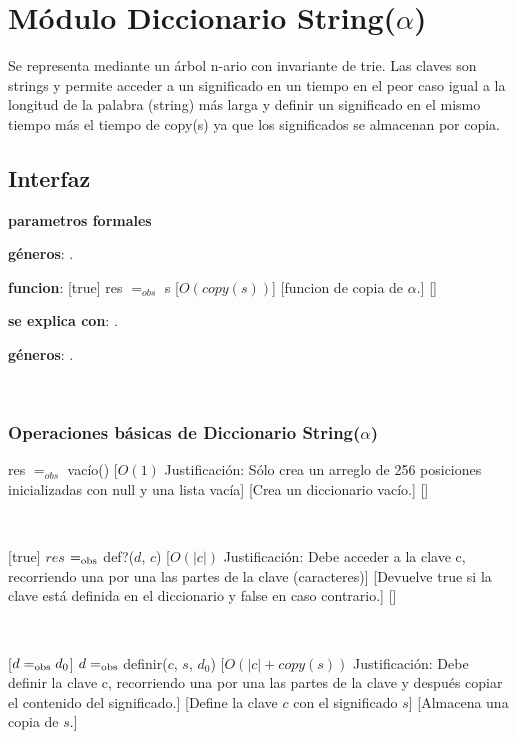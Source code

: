 \section{Módulo Diccionario String($\alpha$)}

Se representa mediante un árbol n-ario con invariante de trie. Las claves son strings y permite acceder a un significado en un tiempo en el peor caso igual a la longitud de la palabra (string) más larga y definir un significado en el mismo tiempo más el tiempo
de copy(s) ya que los significados se almacenan por copia.

\subsection{Interfaz}

\textbf{parametros formales}

\textbf{géneros}: \TipoVariable{$\alpha$}.

\textbf{funcion}: 
				  [true]
				  {res $=_{obs}$ s}
				  [$O(copy(s))$]
				  [funcion de copia de $\alpha$.]
				  []

\textbf{se explica con}: .

\textbf{géneros}: .



~

\subsubsection{Operaciones básicas de Diccionario String($\alpha$)}

{res $=_{obs}$ vacío()}
[$O(1)$ Justificación: Sólo crea un arreglo de 256 posiciones inicializadas con null y una lista vacía]
[Crea un diccionario vacío.]
[]

~



[true]
{$res$ $=_{\mathrm{obs}}$ def?($d$, $c$)}
[$O(|c|)$ Justificación: Debe acceder a la clave c, recorriendo una por una las partes de la clave (caracteres)]
[Devuelve true si la clave está definida en el diccionario y false en caso contrario.]
[]

~

[$ d =_{\mathrm{obs}} d_0 $]
{$ d =_{\mathrm{obs}}$ definir($c$, $s$, $d_0$)}
[$O(|c| + copy(s))$ Justificación: Debe definir la clave c, recorriendo una por una las partes de la clave y después copiar el contenido del significado.]
[Define la clave $c$ con el significado $s$]
[Almacena una copia de $s$.]

